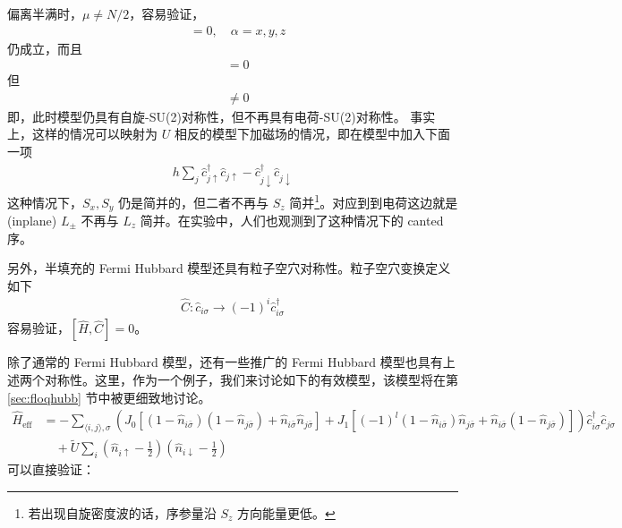 偏离半满时，$\mu\neq N/2$，容易验证，
\begin{align}
[\hat{H}, \hat{S}_{\alpha}] &= 0, \quad \alpha=x,y,z
\end{align}
仍成立，而且
\begin{align}
[\hat{H}, \hat{L}_{z}] &= 0 
\end{align}
但
\begin{align}
[\hat{H}, \hat{L}_{\pm}] &\neq 0 
\end{align}
即，此时模型仍具有自旋-SU(2)对称性，但不再具有电荷-SU(2)对称性。
事实上，这样的情况可以映射为 $U$ 相反的模型下加磁场的情况，即在模型中加入下面一项
\begin{align}
h\sum_{j}\hat{c}_{j\uparrow}^{\dagger}\hat{c}_{j\uparrow} - \hat{c}_{j\downarrow}^{\dagger}\hat{c}_{j\downarrow}
\end{align}
这种情况下，$S_x, S_y$ 仍是简并的，但二者不再与 $S_z$ 简并\footnote{若出现自旋密度波的话，序参量沿 $S_z$ 方向能量更低。}。对应到到电荷这边就是 (inplane) $L_{\pm}$ 不再与 $L_z$ 简并。在实验中，人们也观测到了这种情况下的 canted 序\cite{canted}。


另外，半填充的 Fermi Hubbard 模型还具有粒子空穴对称性。粒子空穴变换定义如下
\begin{align}
\hat{C}: \hat{c}_{i\sigma} \rightarrow (-1)^i\hat{c}_{i\sigma}^{\dagger}
\end{align}
容易验证，$[\hat{H}, \hat{C}]=0$。



除了通常的 Fermi Hubbard 模型，还有一些推广的 Fermi Hubbard 模型也具有上述两个对称性。这里，作为一个例子，我们来讨论如下的有效模型，该模型将在第 \ref{sec:floqhubb} 节中被更细致地讨论。
\begin{align}
\hat{H}_{\text{eff}} &= - \sum_{\langle i,j\rangle, \sigma} 
\left(J_0[(1-\hat{n}_{i\bar\sigma})(1-\hat{n}_{j\bar\sigma}) + \hat{n}_{i\bar\sigma}\hat{n}_{j\bar\sigma}]
+J_1[(-1)^l(1-\hat{n}_{i\bar\sigma})\hat{n}_{j\bar\sigma} + \hat{n}_{i\bar\sigma}(1-\hat{n}_{j\bar\sigma})]\right)
\hat{c}_{i\sigma}^{\dagger}\hat{c}_{j\sigma} \nonumber\\
& \quad + \tilde{U}\sum_{i}\left(\hat{n}_{i\uparrow}-\frac{1}{2}\right)\left(\hat{n}_{i\downarrow}-\frac{1}{2}\right)
\end{align}
可以直接验证：

